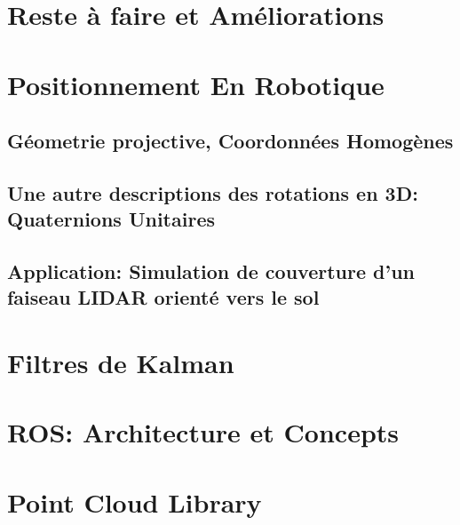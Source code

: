 \documentclass[12pt,a4paper]{report}
\begin{document}
\chapter{Reste à faire et Améliorations}


\begin{appendix}
	\chapter{Positionnement En Robotique}
		\section{Géometrie projective, Coordonnées Homogènes}
		\section{Une autre descriptions des rotations en 3D: Quaternions Unitaires}
		\section{Application: Simulation de couverture d'un faiseau LIDAR orienté vers le sol}
	
	\chapter{Filtres de Kalman}
	
	\chapter{ROS: Architecture et Concepts}
	
	\chapter{Point Cloud Library}

\end{appendix}



\end{document}
